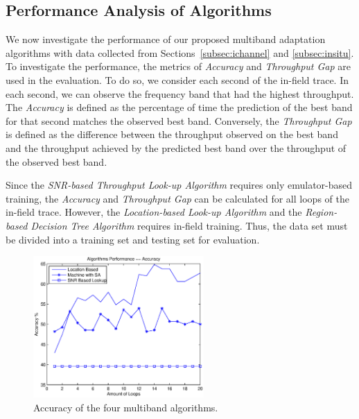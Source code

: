 \subsection{Performance Analysis of Algorithms}
\label{subsec:data process}

We now investigate the performance of our proposed
multiband adaptation algorithms with data collected from 
Sections~\ref{subsec:ichannel} and \ref{subsec:insitu}.
To investigate the performance, the metrics of
{\it Accuracy} and {\it Throughput Gap} are used in the evaluation.
To do so, we consider each second of the in-field trace. In each
second, we can observe the frequency band that had the highest 
throughput.  The \emph{Accuracy} is defined as the percentage of 
time the prediction of the best band for that second matches the 
observed best band. Conversely, the \emph{Throughput Gap} is defined
as the difference between the throughput observed on the best band
and the throughput achieved by the predicted best band over the
throughput of the observed best band. 

%
%

Since the \emph{SNR-based Throughput Look-up Algorithm} requires only 
emulator-based training, the \emph{Accuracy} and \emph{Throughput Gap} can 
be calculated for all loops of the in-field trace.  However, the 
\emph{Location-based Look-up Algorithm} and the \emph{Region-based Decision
Tree Algorithm} requires in-field training. Thus, the data set must be
divided into a training set and testing set for evaluation.

\begin{figure}
\vspace{-0.1in}
\centering
\includegraphics[width=65mm]{figure/performance}
\vspace{-0.1in}
\caption{Accuracy of the four multiband algorithms.}
\label{fig:performance}
\end{figure}

